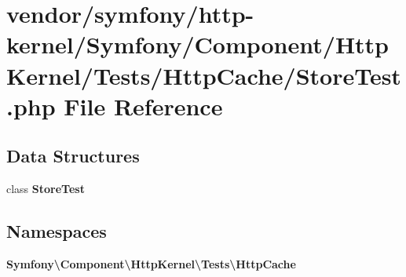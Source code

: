 \section{vendor/symfony/http-\/kernel/\+Symfony/\+Component/\+Http\+Kernel/\+Tests/\+Http\+Cache/\+Store\+Test.php File Reference}
\label{_store_test_8php}
\subsection*{Data Structures}
\begin{DoxyCompactItemize}
\item 
class {\bf Store\+Test}
\end{DoxyCompactItemize}
\subsection*{Namespaces}
\begin{DoxyCompactItemize}
\item 
 {\bf Symfony\textbackslash{}\+Component\textbackslash{}\+Http\+Kernel\textbackslash{}\+Tests\textbackslash{}\+Http\+Cache}
\end{DoxyCompactItemize}
